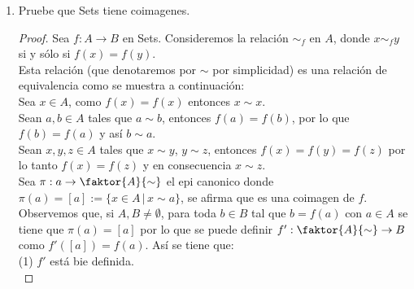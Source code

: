 \documentclass{article}
\begin{document}
\begin{enumerate}[label=\textbf{Ej \arabic*.}]
\begin{proof}
\begin{align*}
				\mu k\lrprth{y}&=\mu\lrprth{h(x)}=f(x)=y=inc(y)\\
				\implies inc&=\mu k.
			\end{align*}
			Con lo anterior se ha verificado que $Sets$ tiene imágenes, más aún, tiene  imágenes epimórficas puesto que la función $g$ así construida es suprayectiva y por tanto epi.\\
			Dado que todo $R$-módulo es en partícular un conjunto no vacío, en forma análoga a lo anterior se verifica que $Mod(R)$ tiene imágenes epimórficas, puesto que si ahora $\catarrow{f}{A}{B}{}$ en $Mod(R)$ entonces la inclusión de módulos es un morfismo de $R$-módulos, $g$ también lo es al serlo $f$, y $k$ lo es al serlo $f$ y $h$.\\
		\end{proof}
		\item Pruebe que Sets tiene coimagenes.
		
		\begin{proof}
			Sea $f:A\to B$ en Sets. Consideremos la relación $\sim_f$ en $A$, donde $x\sim_f y$ si y sólo si $f(x)=f(y)$.\\
			
			Esta relación (que denotaremos por $\sim$ por simplicidad) es una relación de equivalencia como se muestra a continuación:\\
			
			\quad Sea $x\in A$, como $f(x)=f(x)$ entonces $x\sim x$.\\
			
			\quad Sean $a,b\in A$ tales que $a\sim b$, entonces $f(a)=f(b)$, por lo que $f(b)=f(a)$ y así $b\sim a$.\\
			
			\quad Sean $x,y,z\in A$ tales que $x\sim y$, $y\sim z$, entonces $f(x)=f(y)=f(z)$ por lo tanto $f(x)=f(z)$ y en consecuencia
			$x\sim z$.\\
			
			Sea $\pi:a\to \faktor{A}{\sim}$ el epi canonico donde $\pi(a)=[a]:=\{x\in A\,|\,x\sim a\}$, se afirma que es una coimagen de $f$.\\
			
			Observemos que, si $A,B\neq \emptyset$, para toda $b\in B$ tal que $b=f(a)$ con $a\in A$ se tiene que $\pi(a)=[a]$ por lo que se puede definir 
			$f': \faktor{A}{\sim}\to B$ como $f'([a])=f(a)$. Así se tiene que:\\
			
			(1) $f'$ está bie definida.\\
			

\end{proof}
\end{enumerate}
\end{document}
